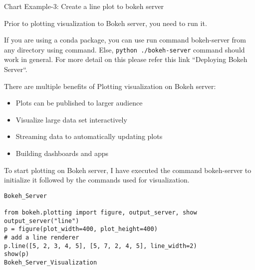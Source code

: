Chart Example-3: Create a line plot to bokeh server

Prior to plotting visualization to Bokeh server, you need to run it.

If you are using a conda package, you can use run command bokeh-server from any directory 
using command. Else, \texttt{python ./bokeh-server} command should work in general. For more detail on this 
please refer this link “Deploying Bokeh Server“.

There are multiple benefits of Plotting visualization on Bokeh server:

\begin{itemize}
\item Plots can be published to larger audience
\item Visualize large data set interactively
\item Streaming data to automatically updating plots
\item Building dashboards and apps
\end{itemize}
To start plotting on Bokeh server, I have executed the command bokeh-server to initialize it followed by 
the commands used for visualization.
\begin{framed}
	\begin{verbatim}
Bokeh_Server

from bokeh.plotting import figure, output_server, show
output_server("line")
p = figure(plot_width=400, plot_height=400)
# add a line renderer
p.line([5, 2, 3, 4, 5], [5, 7, 2, 4, 5], line_width=2)
show(p)
Bokeh_Server_Visualization
\end{verbatim}
\end{framed}

